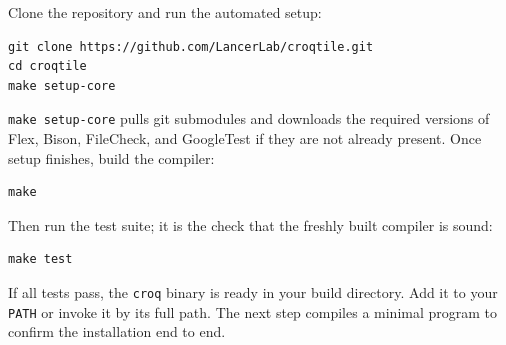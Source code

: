 Clone the repository and run the automated setup:

\begin{lstlisting}[language={},caption={Clone and prepare}]
git clone https://github.com/LancerLab/croqtile.git
cd croqtile
make setup-core
\end{lstlisting}

\texttt{make setup-\allowbreak{}core} pulls git submodules and downloads the required versions of Flex, Bison, FileCheck, and GoogleTest if they are not already present. Once setup finishes, build the compiler:

\begin{lstlisting}[language={},caption={Build the compiler}]
make
\end{lstlisting}

Then run the test suite; it is the check that the freshly built compiler is sound:

\begin{lstlisting}[language={},caption={Run the test suite}]
make test
\end{lstlisting}

If all tests pass, the \texttt{croq} binary is ready in your build directory. Add it to your \texttt{PATH} or invoke it by its full path. The next step compiles a minimal program to confirm the installation end to end.
